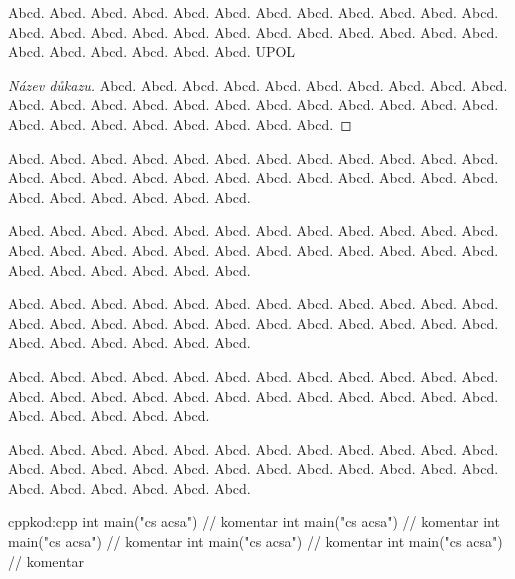 \documentclass[
  biblatex,
  glossaries,
  index
]{kidiplom}
\begin{document}

\begin{definition}
Abcd. Abcd. Abcd. Abcd. Abcd. Abcd. Abcd. Abcd. Abcd. Abcd. Abcd. Abcd. Abcd. Abcd. Abcd. Abcd. Abcd. Abcd. Abcd. Abcd. Abcd. Abcd. Abcd. Abcd. Abcd. Abcd. Abcd. Abcd. Abcd. Abcd. \gls{UPOL}
\end{definition}

\begin{proof}[Název důkazu]
Abcd. Abcd. Abcd. Abcd. Abcd. Abcd. Abcd. Abcd. Abcd. Abcd. Abcd. Abcd. Abcd. Abcd. Abcd. Abcd. Abcd. Abcd. Abcd. Abcd. Abcd. Abcd. Abcd. Abcd. Abcd. Abcd. Abcd. Abcd. Abcd. Abcd. 
\end{proof}

\begin{remark}
Abcd. Abcd. Abcd. Abcd. Abcd. Abcd. Abcd. Abcd. Abcd. Abcd. Abcd. Abcd. Abcd. Abcd. Abcd. Abcd. Abcd. Abcd. Abcd. Abcd. Abcd. Abcd. Abcd. Abcd. Abcd. Abcd. Abcd. Abcd. Abcd. Abcd. 
\end{remark}

\begin{example}
Abcd. Abcd. Abcd. Abcd. Abcd. Abcd. Abcd. Abcd. Abcd. Abcd. Abcd. Abcd. Abcd. Abcd. Abcd. Abcd. Abcd. Abcd. Abcd. Abcd. Abcd. Abcd. Abcd. Abcd. Abcd. Abcd. Abcd. Abcd. Abcd. Abcd. 
\end{example}

\begin{lemma}
Abcd. Abcd. Abcd. Abcd. Abcd. Abcd. Abcd. Abcd. Abcd. Abcd. Abcd. Abcd. Abcd. Abcd. Abcd. Abcd. Abcd. Abcd. Abcd. Abcd. Abcd. Abcd. Abcd. Abcd. Abcd. Abcd. Abcd. Abcd. Abcd. Abcd. 
\end{lemma}

\begin{consequence}
Abcd. Abcd. Abcd. Abcd. Abcd. Abcd. Abcd. Abcd. Abcd. Abcd. Abcd. Abcd. Abcd. Abcd. Abcd. Abcd. Abcd. Abcd. Abcd. Abcd. Abcd. Abcd. Abcd. Abcd. Abcd. Abcd. Abcd. Abcd. Abcd. 
\end{consequence}

\begin{theorem}
Abcd. Abcd. Abcd. Abcd. Abcd. Abcd. Abcd. Abcd. Abcd. Abcd. Abcd. Abcd. Abcd. Abcd. Abcd. Abcd. Abcd. Abcd. Abcd. Abcd. Abcd. Abcd. Abcd. Abcd. Abcd. Abcd. Abcd. Abcd. Abcd. Abcd. 
\end{theorem}


\begin{kicode}{cpp}{kod:cpp}{\cpp}
int main("cs acsa") // komentar
int main("cs acsa") // komentar
int main("cs acsa") // komentar
int main("cs acsa") // komentar
int main("cs acsa") // komentar
\end{kicode}
\end{document}
